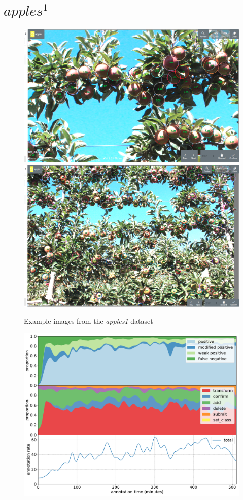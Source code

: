 \pagebreak
\section{$apples^1$}

\begin{figure}[!h]
  \includegraphics[width=0.475\linewidth]{figures/annotation/screenshots/apples_big.png}
  \hfill
  \includegraphics[width=0.45\linewidth]{figures/annotation/screenshots/apples_small.png}
\caption{Example images from the \emph{apples1} dataset}
\label{fig:apples1_dataset}  
\end{figure}

\begin{figure}[!h]
\centering
\includegraphics[width=1.0\linewidth]{charts/action_annotations/apples1.pdf}
\caption{  }
\label{fig:apples1_annotation}
\end{figure}

